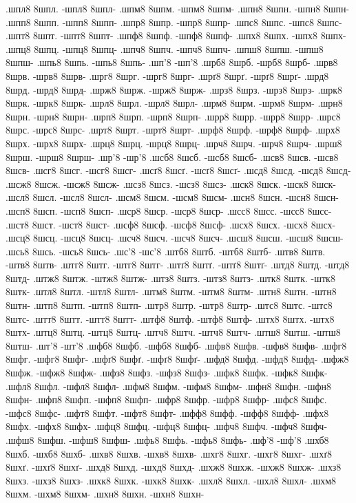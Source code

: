 {.шпл8 8шпл. -шпл8 8шпл-
.шпм8 8шпм. -шпм8 8шпм-
.шпн8 8шпн. -шпн8 8шпн-
.шпп8 8шпп. -шпп8 8шпп-
.шпр8 8шпр. -шпр8 8шпр-
.шпс8 8шпс. -шпс8 8шпс-
.шпт8 8шпт. -шпт8 8шпт-
.шпф8 8шпф. -шпф8 8шпф-
.шпх8 8шпх. -шпх8 8шпх-
.шпц8 8шпц. -шпц8 8шпц-
.шпч8 8шпч. -шпч8 8шпч-
.шпш8 8шпш. -шпш8 8шпш-
.шпь8 8шпь. -шпь8 8шпь-
.шп'8 -шп'8
.шрб8 8шрб. -шрб8 8шрб-
.шрв8 8шрв. -шрв8 8шрв-
.шрг8 8шрг. -шрг8 8шрг-
.шрґ8 8шрґ. -шрґ8 8шрґ-
.шрд8 8шрд. -шрд8 8шрд-
.шрж8 8шрж. -шрж8 8шрж-
.шрз8 8шрз. -шрз8 8шрз-
.шрк8 8шрк. -шрк8 8шрк-
.шрл8 8шрл. -шрл8 8шрл-
.шрм8 8шрм. -шрм8 8шрм-
.шрн8 8шрн. -шрн8 8шрн-
.шрп8 8шрп. -шрп8 8шрп-
.шрр8 8шрр. -шрр8 8шрр-
.шрс8 8шрс. -шрс8 8шрс-
.шрт8 8шрт. -шрт8 8шрт-
.шрф8 8шрф. -шрф8 8шрф-
.шрх8 8шрх. -шрх8 8шрх-
.шрц8 8шрц. -шрц8 8шрц-
.шрч8 8шрч. -шрч8 8шрч-
.шрш8 8шрш. -шрш8 8шрш-
.шр'8 -шр'8
.шсб8 8шсб. -шсб8 8шсб-
.шсв8 8шсв. -шсв8 8шсв-
.шсг8 8шсг. -шсг8 8шсг-
.шсґ8 8шсґ. -шсґ8 8шсґ-
.шсд8 8шсд. -шсд8 8шсд-
.шсж8 8шсж. -шсж8 8шсж-
.шсз8 8шсз. -шсз8 8шсз-
.шск8 8шск. -шск8 8шск-
.шсл8 8шсл. -шсл8 8шсл-
.шсм8 8шсм. -шсм8 8шсм-
.шсн8 8шсн. -шсн8 8шсн-
.шсп8 8шсп. -шсп8 8шсп-
.шср8 8шср. -шср8 8шср-
.шсс8 8шсс. -шсс8 8шсс-
.шст8 8шст. -шст8 8шст-
.шсф8 8шсф. -шсф8 8шсф-
.шсх8 8шсх. -шсх8 8шсх-
.шсц8 8шсц. -шсц8 8шсц-
.шсч8 8шсч. -шсч8 8шсч-
.шсш8 8шсш. -шсш8 8шсш-
.шсь8 8шсь. -шсь8 8шсь-
.шс'8 -шс'8
.штб8 8штб. -штб8 8штб-
.штв8 8штв. -штв8 8штв-
.штг8 8штг. -штг8 8штг-
.штґ8 8штґ. -штґ8 8штґ-
.штд8 8штд. -штд8 8штд-
.штж8 8штж. -штж8 8штж-
.штз8 8штз. -штз8 8штз-
.штк8 8штк. -штк8 8штк-
.штл8 8штл. -штл8 8штл-
.штм8 8штм. -штм8 8штм-
.штн8 8штн. -штн8 8штн-
.штп8 8штп. -штп8 8штп-
.штр8 8штр. -штр8 8штр-
.штс8 8штс. -штс8 8штс-
.штт8 8штт. -штт8 8штт-
.штф8 8штф. -штф8 8штф-
.штх8 8штх. -штх8 8штх-
.штц8 8штц. -штц8 8штц-
.штч8 8штч. -штч8 8штч-
.штш8 8штш. -штш8 8штш-
.шт'8 -шт'8
.шфб8 8шфб. -шфб8 8шфб-
.шфв8 8шфв. -шфв8 8шфв-
.шфг8 8шфг. -шфг8 8шфг-
.шфґ8 8шфґ. -шфґ8 8шфґ-
.шфд8 8шфд. -шфд8 8шфд-
.шфж8 8шфж. -шфж8 8шфж-
.шфз8 8шфз. -шфз8 8шфз-
.шфк8 8шфк. -шфк8 8шфк-
.шфл8 8шфл. -шфл8 8шфл-
.шфм8 8шфм. -шфм8 8шфм-
.шфн8 8шфн. -шфн8 8шфн-
.шфп8 8шфп. -шфп8 8шфп-
.шфр8 8шфр. -шфр8 8шфр-
.шфс8 8шфс. -шфс8 8шфс-
.шфт8 8шфт. -шфт8 8шфт-
.шфф8 8шфф. -шфф8 8шфф-
.шфх8 8шфх. -шфх8 8шфх-
.шфц8 8шфц. -шфц8 8шфц-
.шфч8 8шфч. -шфч8 8шфч-
.шфш8 8шфш. -шфш8 8шфш-
.шфь8 8шфь. -шфь8 8шфь-
.шф'8 -шф'8
.шхб8 8шхб. -шхб8 8шхб-
.шхв8 8шхв. -шхв8 8шхв-
.шхг8 8шхг. -шхг8 8шхг-
.шхґ8 8шхґ. -шхґ8 8шхґ-
.шхд8 8шхд. -шхд8 8шхд-
.шхж8 8шхж. -шхж8 8шхж-
.шхз8 8шхз. -шхз8 8шхз-
.шхк8 8шхк. -шхк8 8шхк-
.шхл8 8шхл. -шхл8 8шхл-
.шхм8 8шхм. -шхм8 8шхм-
.шхн8 8шхн. -шхн8 8шхн-
}
